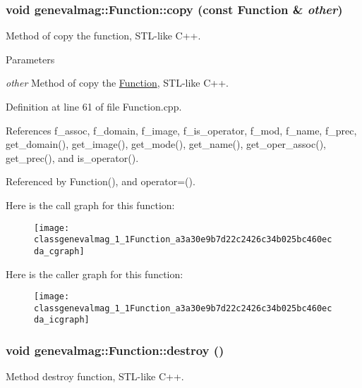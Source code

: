 \hypertarget{classgenevalmag_1_1Function_a3a30e9b7d22c2426c34b025bc460ecda}{
\subsubsection[{copy}]{\setlength{\rightskip}{0pt plus 5cm}void genevalmag::Function::copy (const {\bf Function} \& {\em other})}}
\label{classgenevalmag_1_1Function_a3a30e9b7d22c2426c34b025bc460ecda}
Method of copy the function, STL-\/like C++. 
\begin{DoxyParams}{Parameters}
\item[{\em other}]Method of copy the \hyperlink{classgenevalmag_1_1Function}{Function}, STL-\/like C++. \end{DoxyParams}


Definition at line 61 of file Function.cpp.



References f\_\-assoc, f\_\-domain, f\_\-image, f\_\-is\_\-operator, f\_\-mod, f\_\-name, f\_\-prec, get\_\-domain(), get\_\-image(), get\_\-mode(), get\_\-name(), get\_\-oper\_\-assoc(), get\_\-prec(), and is\_\-operator().



Referenced by Function(), and operator=().



Here is the call graph for this function:\nopagebreak
\begin{figure}[H]
\begin{center}
\leavevmode
\texttt{[image: classgenevalmag\_1\_1Function\_a3a30e9b7d22c2426c34b025bc460ecda\_cgraph]}
\end{center}
\end{figure}




Here is the caller graph for this function:\nopagebreak
\begin{figure}[H]
\begin{center}
\leavevmode
\texttt{[image: classgenevalmag\_1\_1Function\_a3a30e9b7d22c2426c34b025bc460ecda\_icgraph]}
\end{center}
\end{figure}


\hypertarget{classgenevalmag_1_1Function_a280800ca78b087d0d098bc89fe7b5190}{
\subsubsection[{destroy}]{\setlength{\rightskip}{0pt plus 5cm}void genevalmag::Function::destroy ()}}
\label{classgenevalmag_1_1Function_a280800ca78b087d0d098bc89fe7b5190}
Method destroy function, STL-\/like C++.

